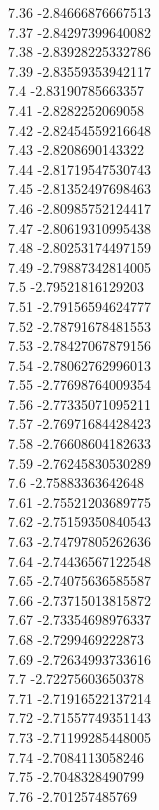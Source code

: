 {7.36	-2.84666876667513\\
7.37	-2.84297399640082\\
7.38	-2.83928225332786\\
7.39	-2.83559353942117\\
7.4	-2.83190785663357\\
7.41	-2.8282252069058\\
7.42	-2.82454559216648\\
7.43	-2.8208690143322\\
7.44	-2.81719547530743\\
7.45	-2.81352497698463\\
7.46	-2.80985752124417\\
7.47	-2.80619310995438\\
7.48	-2.80253174497159\\
7.49	-2.79887342814005\\
7.5	-2.79521816129203\\
7.51	-2.79156594624777\\
7.52	-2.78791678481553\\
7.53	-2.78427067879156\\
7.54	-2.78062762996013\\
7.55	-2.77698764009354\\
7.56	-2.77335071095211\\
7.57	-2.76971684428423\\
7.58	-2.76608604182633\\
7.59	-2.76245830530289\\
7.6	-2.75883363642648\\
7.61	-2.75521203689775\\
7.62	-2.75159350840543\\
7.63	-2.74797805262636\\
7.64	-2.74436567122548\\
7.65	-2.74075636585587\\
7.66	-2.73715013815872\\
7.67	-2.73354698976337\\
7.68	-2.7299469222873\\
7.69	-2.72634993733616\\
7.7	-2.72275603650378\\
7.71	-2.71916522137214\\
7.72	-2.71557749351143\\
7.73	-2.71199285448005\\
7.74	-2.7084113058246\\
7.75	-2.7048328490799\\
7.76	-2.701257485769\\
}
